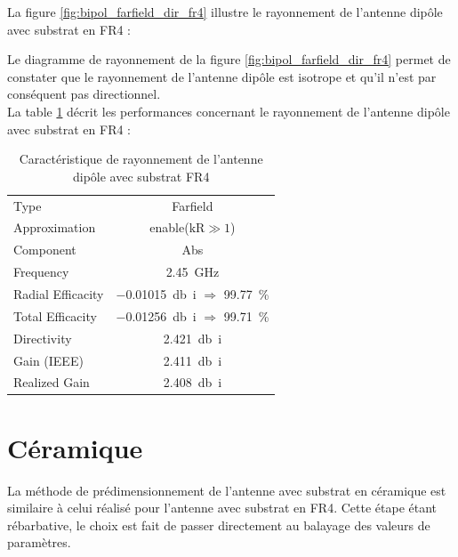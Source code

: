 \documentclass[Deriaz_Traiber_Labo02]{subfiles}
\begin{document}
La figure \ref{fig:bipol_farfield_dir_fr4} illustre le rayonnement de l'antenne dipôle avec substrat en FR4 :


Le diagramme de rayonnement de la figure \ref{fig:bipol_farfield_dir_fr4} permet de constater que le rayonnement de l'antenne dipôle est isotrope et qu'il n'est par conséquent pas directionnel.\\

La table \ref{tab:ray-fr4} décrit les performances concernant le rayonnement de l'antenne dipôle avec substrat en FR4 : 
 
\begin{table}[H]
\centering
\begin{tabular}{l c}\hline
Type					& Farfield\\
Approximation		& enable($\text{kR}\gg1$)\\
Component			& Abs\\
Frequency			& \SI{2.45}{\giga\hertz}\\
Radial Efficacity	& \SI{-0.01015}{\decibel i} $\Rightarrow$ \SI{99.77}{\percent}\\
Total Efficacity		& \SI{-0.01256}{\decibel i} $\Rightarrow$ \SI{99.71}{\percent}\\
Directivity			& \SI{2.421}{\decibel i}\\
Gain	 (IEEE)			& \SI{2.411}{\decibel i}\\
Realized Gain		& \SI{2.408}{\decibel i}\\\hline
\end{tabular}
\caption{Caractéristique de rayonnement de l'antenne dipôle avec substrat FR4}
\label{tab:ray-fr4}
\end{table}



\pagebreak

\section{Céramique}

La méthode de prédimensionnement de l'antenne avec substrat en céramique est similaire à celui réalisé pour l'antenne avec substrat en FR4. Cette étape étant rébarbative, le choix est fait de passer directement au balayage des valeurs de paramètres.
\end{document}
